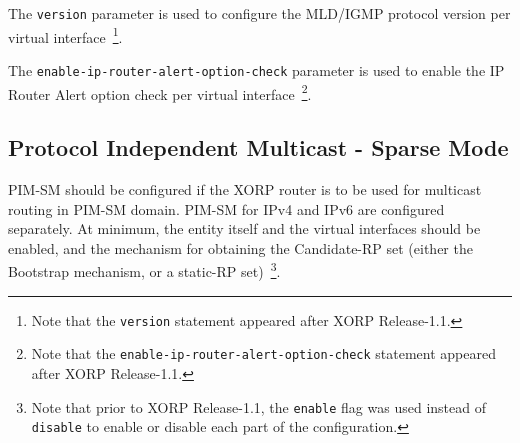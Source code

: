 The {\tt version} parameter is used to configure the MLD/IGMP protocol
version per virtual interface~\footnote{Note that the {\tt version}
statement appeared after XORP Release-1.1.}.

The {\tt enable-ip-router-alert-option-check} parameter is used to
enable the IP Router Alert option check per virtual interface~\footnote{Note
that the {\tt enable-ip-router-alert-option-check} statement appeared after
XORP Release-1.1.}.

\newpage
\subsection{Protocol Independent Multicast - Sparse Mode}
\label{sec:protocols:pim}

PIM-SM should be configured if the XORP router is to be used for
multicast routing in PIM-SM domain. PIM-SM for IPv4 and IPv6 are
configured separately. At minimum, the entity itself and the
virtual interfaces should be enabled, and the mechanism for obtaining
the Candidate-RP set (either the Bootstrap mechanism, or a static-RP
set)~\footnote{Note that prior to XORP Release-1.1, the {\tt enable} flag
was used instead of {\tt disable} to enable or disable each part of the
configuration.}.


